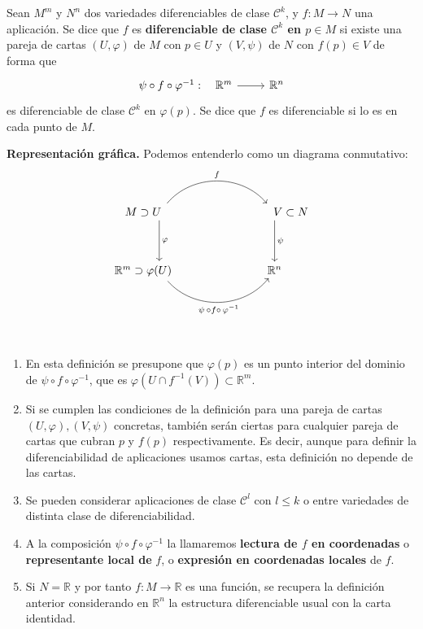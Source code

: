 \begin{defi}
Sean $M^m$ y $N^n$ dos variedades diferenciables de clase $\mathcal{C}^k$, y $f: M \to N$ una aplicación. Se dice que $f$ es \textbf{diferenciable de clase $\mathcal{C}^k$ en $p \in M$} si existe una pareja de cartas $(U,\varphi)$ de $M$ con $p \in U$ y $(V,\psi)$ de $N$ con $f(p) \in V$ de forma que $$\begin{tikzcd}
\psi \circ f \circ \varphi^{-1}: \hspace{-7mm} &  \mathbb{R}^m \rar & \mathbb{R}^n
\end{tikzcd}$$es diferenciable de clase $\mathcal{C}^k$ en $\varphi(p)$. Se dice que $f$ es diferenciable si lo es en cada punto de $M$.
\end{defi}
\textbf{Representaci\'on gr\'afica.} Podemos entenderlo como un diagrama conmutativo:
$$\begin{tikzcd}
    M\supset U \arrow{dd}{\varphi} \hspace{10mm} \arrow[bend left=50]{r}{f} & \hspace{10mm} V\subset N \arrow{dd}{\psi} \\ \\
    \mathbb R^m \supset \varphi(U) \hspace{10mm} \arrow[bend right=50, swap]{r}{\psi \, \circ f \circ \, \varphi^{-1}} & \mathbb R^n
\end{tikzcd}$$
\begin{obss} \, 
\begin{enumerate}
\item En esta definición se presupone que $\varphi(p)$ es un punto interior del dominio de $\psi \circ f \circ \varphi^{-1}$, que es $\varphi(U \cap f^{-1}(V)) \subset \mathbb{R}^m$.
\item Si se cumplen las condiciones de la definición para una pareja de cartas $(U,\varphi),(V,\psi)$ concretas, también serán ciertas para cualquier pareja de cartas que cubran $p$ y $f(p)$ respectivamente. Es decir, aunque para definir la diferenciabilidad de aplicaciones usamos cartas, esta definici\'on no depende de las cartas.
\item Se pueden considerar aplicaciones de clase $\mathcal C^l$ con $l \leq k$ o entre variedades de distinta clase de diferenciabilidad.
\item A la composición $\psi \circ f \circ \varphi^{-1}$ la llamaremos \textbf{lectura de $f$ en coordenadas} o \textbf{representante local de }$f$, o \textbf{expresi\'on en coordenadas locales} de $f$.
\item Si $N = \mathbb{R}$ y por tanto $f: M \to \mathbb{R}$ es una función, se recupera la definición anterior considerando en $\mathbb{R}^n$ la estructura diferenciable usual con la carta identidad.
\end{enumerate}
\end{obss}


